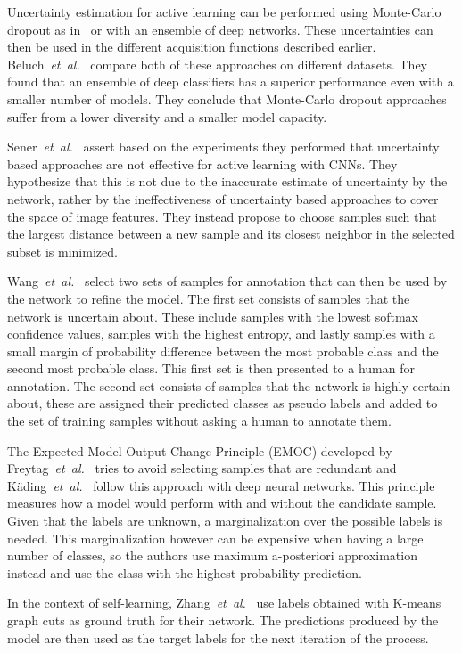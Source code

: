 \documentclass[letterpaper, 10 pt, conference]{ieeeconf}  %
\newcommand\etal{\emph{et~al.}}
\begin{document}
Uncertainty estimation for active learning can be performed using Monte-Carlo dropout as in~\cite{gal2017deep} or with an ensemble of deep networks. These uncertainties can then be used in the different acquisition functions described earlier. Beluch~\etal~\cite{beluch2018power} compare both of these approaches on different datasets. They found that an ensemble of deep classifiers has a superior performance even with a smaller number of models. They conclude that Monte-Carlo dropout approaches suffer from a lower diversity and a smaller model capacity.

Sener~\etal~\cite{sener2017geometric} assert based on the experiments they performed that uncertainty based approaches are not effective for active learning with CNNs. They hypothesize that this is not due to the inaccurate estimate of uncertainty by the network, rather by the ineffectiveness of uncertainty based approaches to cover the space of image features. They instead propose to choose samples such that the largest distance between a new sample and its closest neighbor in the selected subset is minimized.

Wang~\etal~\cite{wang2017cost} select two sets of samples for annotation that can then be used by the network to refine the model. The first set consists of samples that the network is uncertain about. These include samples with the lowest softmax confidence values, samples with the highest entropy, and lastly samples with a small margin of probability difference between the most probable class and the second most probable class. This first set is then presented to a human for annotation. The second set consists of samples that the network is highly certain about, these are assigned their predicted classes as pseudo labels and added to the set of training samples without asking a human to annotate them.

The Expected Model Output Change Principle (EMOC) developed by Freytag~\etal~\cite{freytag2014selecting} tries to avoid selecting samples that are redundant and K{\"a}ding~\etal~\cite{kading2016active} follow this approach with deep neural networks. This principle measures how a model would perform with and without the candidate sample. Given that the labels are unknown, a marginalization over the possible labels is needed. This marginalization however can be expensive when having a large number of classes, so the authors use maximum a-posteriori approximation instead and use the class with the highest probability prediction.

In the context of self-learning, Zhang~\etal~\cite{zhang2018self} use labels obtained with K-means graph cuts as ground truth for their network. The predictions produced by the model are then used as the target labels for the next iteration of the process.  
\end{document}
